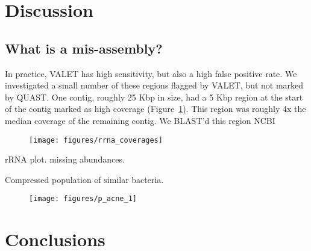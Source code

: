 \section{Discussion}

\subsection{What is a mis-assembly?}

In practice, VALET has high sensitivity, but also a high false positive rate.
We investigated a small number of these regions flagged by VALET, but not marked by QUAST.
One contig, roughly 25 Kbp in size, had a 5 Kbp region at the start of the contig marked as high coverage (Figure~\ref{fig:rrna_misassembly}).
This region was roughly 4x the median coverage of the remaining contig.
We BLAST'd this region NCBI

\begin{figure}[tb!]
\begin{center}
\texttt{[image: figures/rrna\_coverages]}
\end{center}
\renewcommand{\baselinestretch}{1}
\small\normalsize
\begin{quote}
\caption[Flagged mis-assembly]{}
\label{fig:rrna_misassembly}
\end{quote}
\end{figure}
\renewcommand{\baselinestretch}{2}
\small\normalsize


rRNA plot.
missing abundances.

Compressed population of similar bacteria.
\begin{landscape}
\renewcommand{\baselinestretch}{1}
\small\normalsize
\begin{figure}[tb!]
\begin{center}
\texttt{[image: figures/p\_acne\_1]}
\end{center}
\renewcommand{\baselinestretch}{1}
\small\normalsize
\begin{quote}
\caption[Flagged mis-assembly]{}
\label{fig:p_acnes}
\end{quote}
\end{figure}
\renewcommand{\baselinestretch}{2}
\small\normalsize
\end{landscape}

\section{Conclusions}
